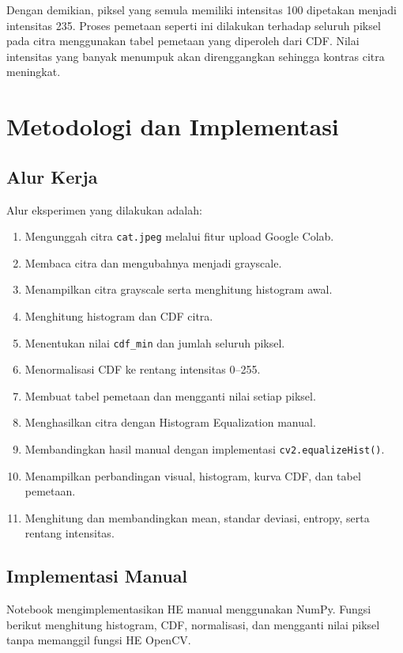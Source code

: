 \documentclass[12pt,a4paper]{article}
\begin{document}
Dengan demikian, piksel yang semula memiliki intensitas 100 dipetakan menjadi intensitas 235. Proses pemetaan seperti ini dilakukan terhadap seluruh piksel pada citra menggunakan tabel pemetaan yang diperoleh dari CDF. Nilai intensitas yang banyak menumpuk akan direnggangkan sehingga kontras citra meningkat.

\section{Metodologi dan Implementasi}

\subsection{Alur Kerja}
Alur eksperimen yang dilakukan adalah:

\begin{enumerate}
    \item Mengunggah citra \texttt{cat.jpeg} melalui fitur upload Google Colab.
    \item Membaca citra dan mengubahnya menjadi grayscale.
    \item Menampilkan citra grayscale serta menghitung histogram awal.
    \item Menghitung histogram dan CDF citra.
    \item Menentukan nilai \texttt{cdf\_min} dan jumlah seluruh piksel.
    \item Menormalisasi CDF ke rentang intensitas 0--255.
    \item Membuat tabel pemetaan dan mengganti nilai setiap piksel.
    \item Menghasilkan citra dengan Histogram Equalization manual.
    \item Membandingkan hasil manual dengan implementasi \texttt{cv2.equalizeHist()}.
    \item Menampilkan perbandingan visual, histogram, kurva CDF, dan tabel pemetaan.
    \item Menghitung dan membandingkan mean, standar deviasi, entropy, serta rentang intensitas.
\end{enumerate}

\subsection{Implementasi Manual}
Notebook mengimplementasikan HE manual menggunakan NumPy. Fungsi berikut menghitung histogram, CDF, normalisasi, dan mengganti nilai piksel tanpa memanggil fungsi HE OpenCV.
\end{document}
